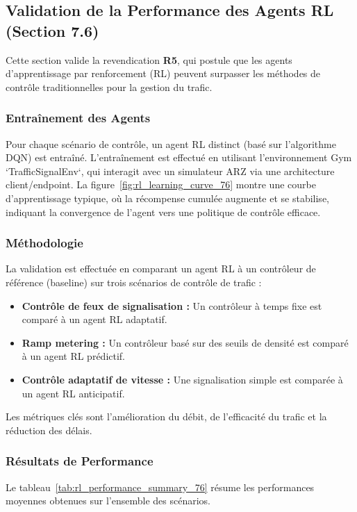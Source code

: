 
\subsection{Validation de la Performance des Agents RL (Section 7.6)}
\label{subsec:validation_rl_performance}

Cette section valide la revendication \textbf{R5}, qui postule que les agents d'apprentissage par renforcement (RL) peuvent surpasser les méthodes de contrôle traditionnelles pour la gestion du trafic.

\subsubsection{Entraînement des Agents}
Pour chaque scénario de contrôle, un agent RL distinct (basé sur l'algorithme DQN) est entraîné. L'entraînement est effectué en utilisant l'environnement Gym `TrafficSignalEnv`, qui interagit avec un simulateur ARZ via une architecture client/endpoint. La figure~\ref{fig:rl_learning_curve_76} montre une courbe d'apprentissage typique, où la récompense cumulée augmente et se stabilise, indiquant la convergence de l'agent vers une politique de contrôle efficace.

\subsubsection{Méthodologie}
La validation est effectuée en comparant un agent RL à un contrôleur de référence (baseline) sur trois scénarios de contrôle de trafic :
\begin{itemize}
    \item \textbf{Contrôle de feux de signalisation :} Un contrôleur à temps fixe est comparé à un agent RL adaptatif.
    \item \textbf{Ramp metering :} Un contrôleur basé sur des seuils de densité est comparé à un agent RL prédictif.
    \item \textbf{Contrôle adaptatif de vitesse :} Une signalisation simple est comparée à un agent RL anticipatif.
\end{itemize}
Les métriques clés sont l'amélioration du débit, de l'efficacité du trafic et la réduction des délais.

\subsubsection{Résultats de Performance}

Le tableau~\ref{tab:rl_performance_summary_76} résume les performances moyennes obtenues sur l'ensemble des scénarios.

